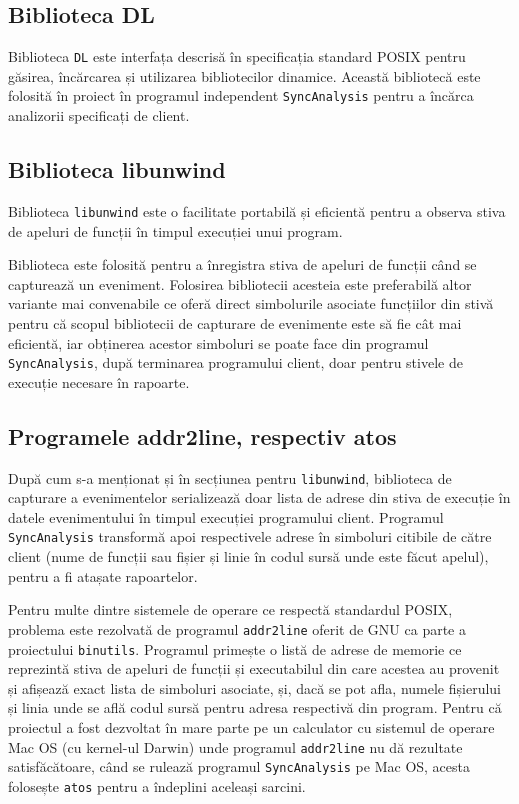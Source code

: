 \subsection{Biblioteca DL}

Biblioteca \lstinline{DL}\cite{DL} este interfața descrisă în
specificația standard POSIX pentru găsirea, încărcarea și utilizarea
bibliotecilor dinamice. Această bibliotecă este folosită în proiect în
programul independent \lstinline{SyncAnalysis} pentru a încărca
analizorii specificați de client.

\subsection{Biblioteca libunwind}

Biblioteca \lstinline{libunwind}\cite{libunwind} este o facilitate
portabilă și eficientă pentru a observa stiva de apeluri de funcții în
timpul execuției unui program.

Biblioteca este folosită pentru a înregistra stiva de apeluri de funcții
când se capturează un eveniment. Folosirea bibliotecii acesteia este
preferabilă altor variante mai convenabile ce oferă direct simbolurile
asociate funcțiilor din stivă pentru că scopul bibliotecii de capturare
de evenimente este să fie cât mai eficientă, iar obținerea acestor
simboluri se poate face din programul \lstinline{SyncAnalysis}, după
terminarea programului client, doar pentru stivele de execuție necesare
în rapoarte.

\subsection{Programele addr2line, respectiv atos}

După cum s-a menționat și în secțiunea pentru \lstinline{libunwind},
biblioteca de capturare a evenimentelor serializează doar lista de
adrese din stiva de execuție în datele evenimentului în timpul execuției
programului client. Programul \lstinline{SyncAnalysis} transformă apoi
respectivele adrese în simboluri citibile de către client (nume de
funcții sau fișier și linie în codul sursă unde este făcut apelul),
pentru a fi atașate rapoartelor.

Pentru multe dintre sistemele de operare ce respectă standardul POSIX,
problema este rezolvată de programul \lstinline{addr2line} oferit de GNU
ca parte a proiectului \lstinline{binutils}\cite{binutils}. Programul
primește o listă de adrese de memorie ce reprezintă stiva de apeluri de
funcții și executabilul din care acestea au provenit și afișează exact
lista de simboluri asociate, și, dacă se pot afla, numele fișierului și
linia unde se află codul sursă pentru adresa respectivă din program.
Pentru că proiectul a fost dezvoltat în mare parte pe un calculator cu
sistemul de operare Mac OS (cu kernel-ul Darwin) unde programul
\lstinline{addr2line} nu dă rezultate satisfăcătoare, când se rulează
programul \lstinline{SyncAnalysis} pe Mac OS, acesta folosește
\lstinline{atos}\cite{atos} pentru a îndeplini aceleași sarcini.


